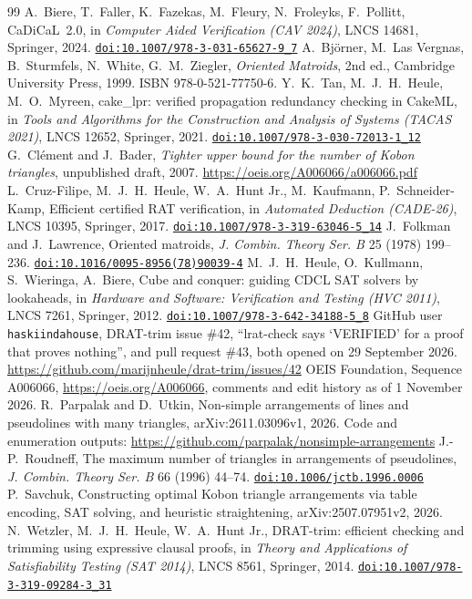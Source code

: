 \documentclass[11pt]{article}
\newcommand{\doi}[1]{\href{https://doi.org/#1}{\nolinkurl{doi:#1}}}
\theoremstyle{definition}
\theoremstyle{remark}
\begin{document}
\begin{thebibliography}{99}
 A.~Biere, T.~Faller, K.~Fazekas, M.~Fleury, N.~Froleyks, F.~Pollitt, CaDiCaL~2.0,
  in \emph{Computer Aided Verification (CAV 2024)}, LNCS 14681, Springer, 2024. \doi{10.1007/978-3-031-65627-9_7}
 A.~Bj\"orner, M.~Las Vergnas, B.~Sturmfels, N.~White, G.~M.~Ziegler,
  \emph{Oriented Matroids}, 2nd ed., Cambridge University Press, 1999. ISBN 978-0-521-77750-6.
 Y.~K.~Tan, M.~J.~H.~Heule, M.~O.~Myreen, cake\_lpr: verified propagation
  redundancy checking in CakeML, in \emph{Tools and Algorithms for the Construction and Analysis of
  Systems (TACAS 2021)}, LNCS 12652, Springer, 2021. \doi{10.1007/978-3-030-72013-1_12}
 G.~Cl\'ement and J.~Bader, \emph{Tighter upper bound for the number of Kobon
  triangles}, unpublished draft, 2007. \url{https://oeis.org/A006066/a006066.pdf}
 L.~Cruz-Filipe, M.~J.~H.~Heule, W.~A.~Hunt Jr., M.~Kaufmann, P.~Schneider-Kamp,
  Efficient certified RAT verification, in \emph{Automated Deduction (CADE-26)}, LNCS 10395,
  Springer, 2017. \doi{10.1007/978-3-319-63046-5_14}
 J.~Folkman and J.~Lawrence, Oriented matroids, \emph{J. Combin. Theory Ser. B} 25
  (1978) 199--236. \doi{10.1016/0095-8956(78)90039-4}
 M.~J.~H.~Heule, O.~Kullmann, S.~Wieringa, A.~Biere, Cube and conquer: guiding CDCL
  SAT solvers by lookaheads, in \emph{Hardware and Software: Verification and Testing (HVC 2011)},
  LNCS 7261, Springer, 2012. \doi{10.1007/978-3-642-34188-5_8}
 GitHub user \texttt{haskiindahouse}, DRAT-trim issue \#42, ``lrat-check says
  `VERIFIED' for a proof that proves nothing'', and pull request \#43, both opened on 29 September
  2026. \url{https://github.com/marijnheule/drat-trim/issues/42}
 OEIS Foundation, Sequence A006066, \url{https://oeis.org/A006066}, comments and
  edit history as of 1 November 2026.
 R.~Parpalak and D.~Utkin, Non-simple arrangements of lines and pseudolines with many
  triangles, arXiv:2611.03096v1, 2026. Code and enumeration outputs:
  \url{https://github.com/parpalak/nonsimple-arrangements}
 J.-P.~Roudneff, The maximum number of triangles in arrangements of pseudolines,
  \emph{J. Combin. Theory Ser. B} 66 (1996) 44--74. \doi{10.1006/jctb.1996.0006}
 P.~Savchuk, Constructing optimal Kobon triangle arrangements via table encoding,
  SAT solving, and heuristic straightening, arXiv:2507.07951v2, 2026.
 N.~Wetzler, M.~J.~H.~Heule, W.~A.~Hunt Jr., DRAT-trim: efficient checking and
  trimming using expressive clausal proofs, in \emph{Theory and Applications of Satisfiability
  Testing (SAT 2014)}, LNCS 8561, Springer, 2014. \doi{10.1007/978-3-319-09284-3_31}
\end{thebibliography}
\end{document}
